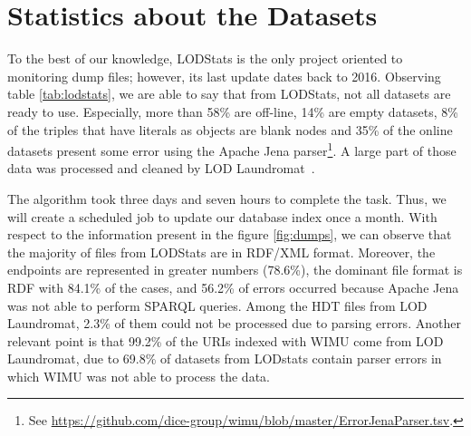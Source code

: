 \section{Statistics about the Datasets}


To the best of our knowledge, LODStats\cite{auer2012lodstats} is the only project oriented to monitoring dump files; however, its last update dates back to 2016. 
Observing table \ref{tab:lodstats}, we are able to say that from LODStats, not all datasets are ready to use.
Especially, more than 58\% are off-line, 14\% are empty datasets, 8\% of the triples that have literals as objects are blank nodes and 35\% of the online datasets present some error using the Apache Jena parser\footnote{See \url{https://github.com/dice-group/wimu/blob/master/ErrorJenaParser.tsv}.}. 
A large part of those data was processed and cleaned by LOD Laundromat~\cite{beek2014lod}.


\setlength{\tabcolsep}{0.5em} %
\begin{table}[H]
	\centering
	\caption{Datasets.}
	\label{tab:lodstats}
\end{table}

The algorithm took three days and seven hours to complete the task. 
Thus, we will create a scheduled job to update our database index once a month.
With respect to the information present in the figure \ref{fig:dumps}, we can observe that the majority of files from LODStats are in RDF/XML format.
Moreover, the endpoints are represented in greater numbers (78.6\%), the dominant file format is RDF with 84.1\% of the cases, and 56.2\% of errors occurred because Apache Jena was not able to perform SPARQL queries.
Among the HDT files from LOD Laundromat, 2.3\% of them could not be processed due to parsing errors.
Another relevant point is that 99.2\% of the URIs indexed with WIMU come from LOD Laundromat, due to 69.8\% of datasets from LODstats contain parser errors in which WIMU was not able to process the data.

